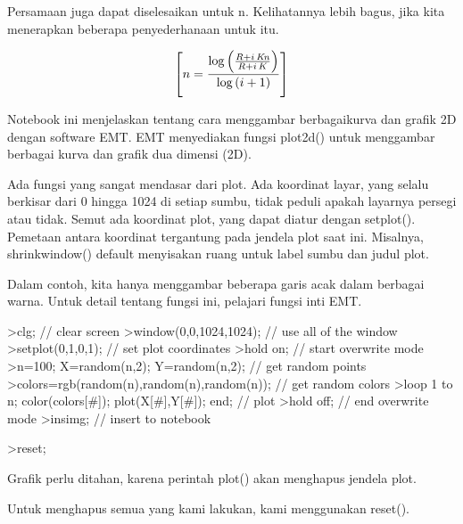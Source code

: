 \documentclass[a4paper,10pt]{article}
\begin{document}
\begin{eulernotebook}
\begin{eulercomment}
\begin{eulercomment}
\begin{eulercomment}
\begin{eulercomment}
\begin{eulercomment}
\begin{eulercomment}
\begin{eulercomment}
\begin{eulercomment}
\begin{eulercomment}
Persamaan juga dapat diselesaikan untuk n. Kelihatannya lebih bagus,
jika kita menerapkan beberapa penyederhanaan untuk itu.
\end{eulercomment}
\begin{eulerformula}
\[
\left[ n=\frac{\log \left(\frac{R+i\,{\it Kn}}{R+i\,K}\right)}{  \log \left(i+1\right)} \right] 
\]
\end{eulerformula}
\begin{eulercomment}
Notebook ini menjelaskan tentang cara menggambar berbagaikurva dan
grafik 2D dengan software EMT. EMT menyediakan fungsi plot2d() untuk
menggambar berbagai kurva dan grafik dua dimensi (2D).\\
\end{eulercomment}
\begin{eulercomment}
Ada fungsi yang sangat mendasar dari plot. Ada koordinat layar, yang
selalu berkisar dari 0 hingga 1024 di setiap sumbu, tidak peduli
apakah layarnya persegi atau tidak. Semut ada koordinat plot, yang
dapat diatur dengan setplot(). Pemetaan antara koordinat tergantung
pada jendela plot saat ini. Misalnya, shrinkwindow() default
menyisakan ruang untuk label sumbu dan judul plot.

Dalam contoh, kita hanya menggambar beberapa garis acak dalam berbagai
warna. Untuk detail tentang fungsi ini, pelajari fungsi inti EMT.
\end{eulercomment}
\begin{eulerprompt}
>clg; // clear screen
>window(0,0,1024,1024); // use all of the window
>setplot(0,1,0,1); // set plot coordinates
>hold on; // start overwrite mode
>n=100; X=random(n,2); Y=random(n,2);  // get random points
>colors=rgb(random(n),random(n),random(n)); // get random colors
>loop 1 to n; color(colors[#]); plot(X[#],Y[#]); end; // plot
>hold off; // end overwrite mode
>insimg; // insert to notebook
\end{eulerprompt}
\begin{eulerprompt}
>reset;
\end{eulerprompt}
\begin{eulercomment}
Grafik perlu ditahan, karena perintah plot() akan menghapus jendela
plot.

Untuk menghapus semua yang kami lakukan, kami menggunakan reset().


\end{eulercomment}
\end{eulercomment}
\end{eulercomment}
\end{eulercomment}
\end{eulercomment}
\end{eulercomment}
\end{eulercomment}
\end{eulercomment}
\end{eulercomment}
\end{eulernotebook}
\end{document}
